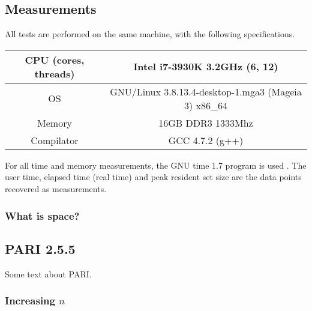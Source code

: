\documentclass[a4paper]{article}
\newcommand{\code}{\texttt}
\begin{document}
\subsection{Measurements}
All tests are performed on the same machine, with the following specifications.

\begin{center}
\begin{tabular}{|c|c|} \hline
CPU (cores, threads) & Intel i7-3930K 3.2GHz (6, 12) \\ \hline
OS & GNU/Linux 3.8.13.4-desktop-1.mga3 (Mageia 3) x86\_64 \\ \hline
Memory & 16GB DDR3 1333Mhz \\ \hline
Compilator & GCC 4.7.2 (g++) \\ \hline
\end{tabular}
\end{center}

For all time and memory measurements, the GNU time 1.7 program is used \cite{time}. The user time, elapsed time (real time) and peak resident set size are the data points recovered as measurements.

% 

\subsubsection{What is space?}\label{whatisspace}

\subsection{PARI 2.5.5}
Some text about PARI. %

\subsubsection{Increasing $n$}
\end{document}
